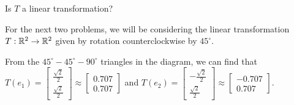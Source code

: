 
Is $T$ a linear transformation?  





\endedxproblem


\endedxvertical











For the next two problems, we will be considering the linear transformation $T: \mathbb R^2 \rightarrow \mathbb R^2$
given by rotation counterclockwise by $45^\circ$.  


\begin{center}
 

\end{center}


From the $45^\circ-45^\circ-90^\circ$ triangles in the diagram, we can find that  
$T(e_1) = \left[ \begin{array}{c} \frac{\sqrt{2}}{2} \\ \frac{\sqrt{2}}{2}  \end{array} \right] \approx
\left[ \begin{array}{c} 0.707 \\ 0.707 \end{array} \right]$ and
$T(e_2) = \left[ \begin{array}{c} -\frac{\sqrt{2}}{2} \\ \frac{\sqrt{2}}{2}  \end{array} \right] \approx
\left[ \begin{array}{c} -0.707 \\ 0.707  \end{array} \right].$   

